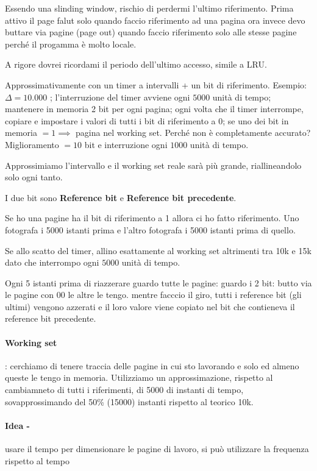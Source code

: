 Essendo una slinding window, rischio di perdermi l'ultimo riferimento.
Prima attivo il page falut solo quando faccio riferimento ad una pagina ora invece
devo buttare via pagine (page out) quando faccio riferimento solo alle stesse pagine perché
il progamma è molto locale.

A rigore dovrei ricordami il periodo dell'ultimo accesso, simile a LRU.

Approssimativamente con un timer a intervalli + un bit di riferimento. Esempio: $\Delta = 10.000$ ; l'interruzione del timer avviene ogni $5000$ unità di tempo; mantenere in memoria 2 bit per ogni pagina; ogni volta che il timer interrompe, copiare e impostare i valori di tutti i bit di riferimento a 0; se uno dei bit in memoria $= 1 \implies$ pagina nel working set. Perché non è completamente accurato? Miglioramento $= 10$ bit e interruzione ogni $1000$ unità di tempo.


Approssimiamo l'intervallo e il working set reale sarà più grande, riallineandolo
solo ogni tanto.

I due bit sono \textbf{Reference bit} e \textbf{Reference bit precedente}.

Se ho una pagine ha il bit di riferimento a 1 allora ci ho fatto riferimento.
Uno fotografa i 5000 istanti prima e l'altro fotografa i 5000 istanti prima di quello.

Se allo scatto del timer, allino esattamente al working set altrimenti tra 10k e 15k dato che interrompo ogni $5000$ unità di tempo.

Ogni 5 istanti prima di riazzerare guardo tutte le pagine:
guardo i 2 bit: butto via le pagine con 00 le altre le tengo.
mentre facccio il giro, tutti i reference bit (gli ultimi) vengono azzerati e il loro
valore viene copiato nel bit che contieneva il reference bit precedente.



\paragraph{Working set}: cerchiamo di tenere traccia delle pagine in cui sto lavorando e solo ed almeno queste
le tengo in memoria. Utilizziamo un approssimazione, rispetto al cambiamneto di tutti i riferimenti,
di 5000 di instanti di tempo, sovapprossimando del 50\% (15000) instanti rispetto al teorico 10k.


\paragraph{Idea -} usare il tempo per dimensionare le pagine di lavoro, si può utilizzare la
frequenza rispetto al tempo



